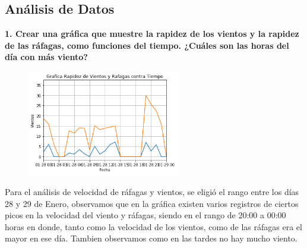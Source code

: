 \documentclass[12pt]{article}
\begin{document}
\subsection{Análisis de Datos}
\noindent\textbf {1. Crear una gráfica que muestre la rapidez de los vientos y la rapidez de las ráfagas, como funciones del tiempo. ¿Cuáles son las horas del día con más viento?} \\
\begin{figure}
    \centering
    \includegraphics[width=0.6\textwidth]{ViRa.png}
\end{figure}
Para el análisis de velocidad de ráfagas y vientos, se eligió el rango entre los días 28 y 29 de Enero, observamos que en la gráfica existen varios registros de ciertos picos en la velocidad del viento y ráfagas, siendo en el rango de 20:00 a 00:00 horas en donde, tanto como la velocidad de los vientos, como de las ráfagas era el mayor en ese día. Tambien observamos como en las tardes no hay mucho viento.\\\\
\end{document}

